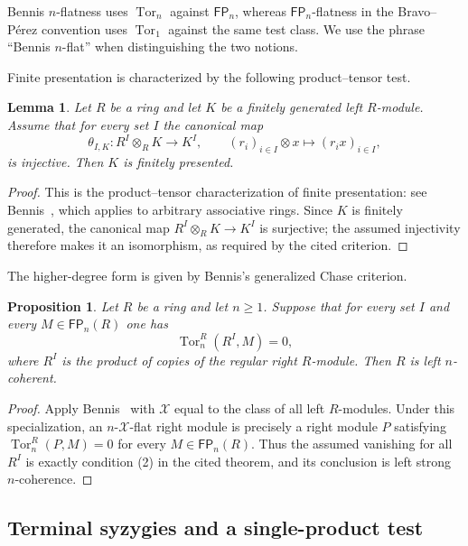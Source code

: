 \documentclass[11pt]{article}
\numberwithin{equation}{section}
\newtheorem{proposition}[theorem]{Proposition}
\newtheorem{lemma}[theorem]{Lemma}
\theoremstyle{definition}
\theoremstyle{remark}
\newcommand{\Tor}{\operatorname{Tor}}
\newcommand{\FP}{\mathsf{FP}}
\begin{document}
Bennis $n$-flatness uses $\Tor_n$ against $\FP_n$, whereas
$\FP_n$-flatness in the Bravo--P\'erez convention uses $\Tor_1$
against the same test class.  We use the phrase ``Bennis $n$-flat''
when distinguishing the two notions.

Finite presentation is characterized by the following product--tensor test.

\begin{lemma}
\label{sy:lem:fp-product}
Let $R$ be a ring and let $K$ be a finitely generated left $R$-module.
Assume that for every set $I$ the canonical map
\[
\theta_{I,K}:R^I\otimes_R K\longrightarrow K^I,
\qquad
(r_i)_{i\in I}\otimes x\longmapsto(r_i x)_{i\in I},
\]
is injective.  Then $K$ is finitely presented.
\end{lemma}

\begin{proof}
This is the product--tensor characterization of finite presentation:
see Bennis~\cite[Lemma~2.4, equivalence (1)--(2) with $n=1$]{Bennis},
which applies to arbitrary associative rings.  Since $K$ is finitely
generated, the canonical map $R^I\otimes_R K\to K^I$ is surjective;
the assumed injectivity therefore makes it an isomorphism, as required
by the cited criterion.
\end{proof}

The higher-degree form is given by Bennis's generalized Chase criterion.

\begin{proposition}
\label{sy:prop:tor-implies-ncoh}
Let $R$ be a ring and let $n\geq1$.  Suppose that for every set $I$ and
every $M\in\FP_n(R)$ one has
\begin{equation}
\Tor_n^R(R^I,M)=0,
\label{sy:eq:top-tor-criterion}
\end{equation}
where $R^I$ is the product of copies of the regular right $R$-module.
Then $R$ is left $n$-coherent.
\end{proposition}

\begin{proof}
Apply Bennis~\cite[Theorem~2.6, implication (2)$\Rightarrow$(1)]{Bennis}
with $\mathcal X$ equal to the class of all left $R$-modules.
Under this specialization, an $n$-$\mathcal X$-flat right module is
precisely a right module $P$ satisfying
$\Tor_n^R(P,M)=0$ for every $M\in\FP_n(R)$.
Thus the assumed vanishing for all $R^I$ is exactly condition (2)
in the cited theorem, and its conclusion is left strong
$n$-coherence.
\end{proof}


\subsection{Terminal syzygies and a single-product test}\label{subsec:one-product-general}
\end{document}
